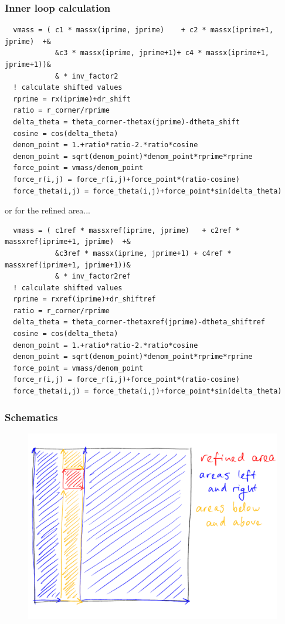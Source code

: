 \documentclass{beamer}
\begin{document}
\begin{frame}[fragile]
 \frametitle{Inner loop calculation}
 \begin{lstlisting}
  vmass = ( c1 * massx(iprime, jprime)    + c2 * massx(iprime+1, jprime)  +&
            &c3 * massx(iprime, jprime+1)+ c4 * massx(iprime+1, jprime+1))&
            & * inv_factor2
  ! calculate shifted values
  rprime = rx(iprime)+dr_shift
  ratio = r_corner/rprime
  delta_theta = theta_corner-thetax(jprime)-dtheta_shift
  cosine = cos(delta_theta)
  denom_point = 1.+ratio*ratio-2.*ratio*cosine
  denom_point = sqrt(denom_point)*denom_point*rprime*rprime
  force_point = vmass/denom_point
  force_r(i,j) = force_r(i,j)+force_point*(ratio-cosine)
  force_theta(i,j) = force_theta(i,j)+force_point*sin(delta_theta)
 \end{lstlisting}
 or for the refined area...
 \begin{lstlisting}
  vmass = ( c1ref * massxref(iprime, jprime)   + c2ref * massxref(iprime+1, jprime)  +&
            &c3ref * massx(iprime, jprime+1) + c4ref * massxref(iprime+1, jprime+1))&
            & * inv_factor2ref
  ! calculate shifted values
  rprime = rxref(iprime)+dr_shiftref
  ratio = r_corner/rprime
  delta_theta = theta_corner-thetaxref(jprime)-dtheta_shiftref
  cosine = cos(delta_theta)
  denom_point = 1.+ratio*ratio-2.*ratio*cosine
  denom_point = sqrt(denom_point)*denom_point*rprime*rprime
  force_point = vmass/denom_point
  force_r(i,j) = force_r(i,j)+force_point*(ratio-cosine)
  force_theta(i,j) = force_theta(i,j)+force_point*sin(delta_theta)
 \end{lstlisting}
\end{frame}
\begin{frame}
 \frametitle{Schematics}
 \begin{figure}[H]
  \centering
  \includegraphics[width=.8\textwidth]{schematics.pdf}
 \end{figure}
\end{frame}
\end{document}
